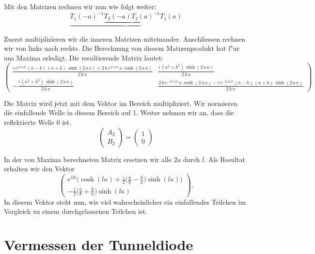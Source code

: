 \begin{refsection}
Mit den Matrizen rechnen wir nun wie folgt weiter:
\[
\underbrace{
T_1(-a)^{-1}
\underbrace{
T_2(-a)T_2(a)^{-1}
}
T_1(a)
}
\]

Zuerst multiplizieren wir die inneren Matrizen miteinander. Anschliessen rechnen wir von links nach rechts. Die Berechnung von diesem Matizenprodukt hat f"ur uns Maxima erledigt. Die resultierende Matrix lautet:
\[
\begin{pmatrix}
\frac{i\,e^{2\,i\,a\,k}\,\left(\kappa-k\right)\,\left(\kappa+k
 \right)\,\sinh \left(2\,a\,\kappa\right)+2\,k\,e^{2\,i\,a\,k}\,
 \kappa\,\cosh \left(2\,a\,\kappa\right)}{2\,k\,\kappa}
&
\frac{i\,
 \left(\kappa^2+k^2\right)\,\sinh \left(2\,a\,\kappa\right)}{2\,
 k\,\kappa}
\\
-\frac{i\,\left(\kappa^2+k^2\right)\,\sinh \left(2\,a\,
 \kappa\right)}{2\,k\,\kappa}
&
\frac{2\,k\,e^ {- 2\,i\,a\,k }\,
 \kappa\,\cosh \left(2\,a\,\kappa\right)-i\,e^ {- 2\,i\,a\,k }\,
 \left(\kappa-k\right)\,\left(\kappa+k\right)\,\sinh \left(2\,a\,
 \kappa\right)}{2\,k\,\kappa}
\end{pmatrix}
\]

Die Matrix wird jetzt mit dem Vektor im Bereich  multipliziert. Wir normieren die einfallende Welle in diesem Bereich auf 1. Weiter nehmen wir an, dass die reflektierte Welle 0 ist.
\[
\begin{pmatrix}
A_2
\\
B_2
\end{pmatrix}
=
\begin{pmatrix}
1
\\
0
\end{pmatrix}
\]

In der von Maxima berechneten Matrix ersetzen wir alle $2a$ durch $l$. Als Resultat erhalten wir den Vektor
\[
\begin{pmatrix}
\displaystyle
e^{ilk}\biggl(\cosh(l\kappa)
+\frac{i}{2}\biggl(\frac{\kappa}{k}-\frac{k}{\kappa}\biggr)\sinh(l\kappa)
\biggr)
\\
\displaystyle
- \frac{i}{2}
\biggl(\frac{\kappa}{k}+\frac{k}{\kappa}\biggr)
\sinh(l\kappa)
\end{pmatrix}.
\]
In diesem Vektor steht nun, wie viel wahrscheinlicher ein einfallendes
Teilchen im Vergleich zu einem durchgelassenen Teilchen ist.

\section{Vermessen der Tunneldiode}


%



\printbibliography[heading=subbibliography]
\end{refsection}

